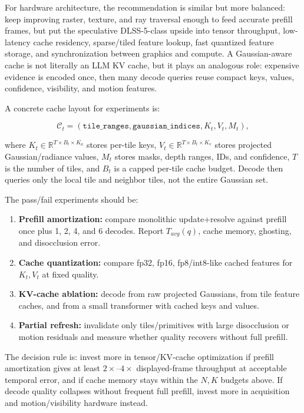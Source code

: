 \documentclass[11pt]{article}
\begin{document}
For hardware architecture, the recommendation is similar but more balanced:
keep improving raster, texture, and ray traversal enough to feed accurate
prefill frames, but put the speculative DLSS-5-class upside into tensor
throughput, low-latency cache residency, sparse/tiled feature lookup, fast
quantized feature storage, and synchronization between graphics and compute.
A Gaussian-aware cache is not literally an LLM KV cache, but it plays an
analogous role: expensive evidence is encoded once, then many decode queries
reuse compact keys, values, confidence, visibility, and motion features.

A concrete cache layout for experiments is:

\[
  \mathcal{C}_t =
  (\texttt{tile\_ranges},\texttt{gaussian\_indices},K_t,V_t,M_t),
\]

where $K_t\in\mathbb{R}^{T\times B_t\times K_a}$ stores per-tile keys,
$V_t\in\mathbb{R}^{T\times B_t\times K_v}$ stores projected Gaussian/radiance
values, $M_t$ stores masks, depth ranges, IDs, and confidence, $T$ is the
number of tiles, and $B_t$ is a capped per-tile cache budget. Decode then
queries only the local tile and neighbor tiles, not the entire Gaussian set.

The pass/fail experiments should be:

\begin{enumerate}
  \item \textbf{Prefill amortization:} compare monolithic update+resolve against
        prefill once plus 1, 2, 4, and 6 decodes. Report $T_{avg}(q)$,
        cache memory, ghosting, and disocclusion error.
  \item \textbf{Cache quantization:} compare fp32, fp16, fp8/int8-like cached
        features for $K_t,V_t$ at fixed quality.
  \item \textbf{KV-cache ablation:} decode from raw projected Gaussians, from
        tile feature caches, and from a small transformer with cached keys and
        values.
  \item \textbf{Partial refresh:} invalidate only tiles/primitives with large
        disocclusion or motion residuals and measure whether quality recovers
        without full prefill.
\end{enumerate}

The decision rule is: invest more in tensor/KV-cache optimization if prefill
amortization gives at least $2\times$--$4\times$ displayed-frame throughput at
acceptable temporal error, and if cache memory stays within the $N,K$ budgets
above. If decode quality collapses without frequent full prefill, invest more
in acquisition and motion/visibility hardware instead.
\end{document}
